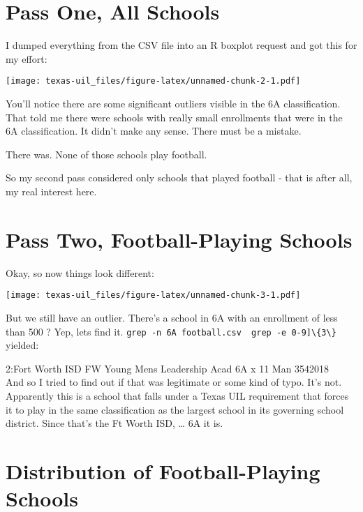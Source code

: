 \documentclass[]{book}
\begin{document}
\section{Pass One, All Schools}\label{pass-one-all-schools}

I dumped everything from the CSV file into an R boxplot request and got
this for my effort:

\texttt{[image: texas-uil\_files/figure-latex/unnamed-chunk-2-1.pdf]}

You'll notice there are some significant outliers visible in the 6A
classification. That told me there were schools with really small
enrollments that were in the 6A classification. It didn't make any
sense. There must be a mistake.

There was. None of those schools play football.

So my second pass considered only schools that played football - that is
after all, my real interest here.

\section{Pass Two, Football-Playing
Schools}\label{pass-two-football-playing-schools}

Okay, so now things look different:

\texttt{[image: texas-uil\_files/figure-latex/unnamed-chunk-3-1.pdf]}

But we still have an outlier. There's a school in 6A with an enrollment
of less than 500 ? Yep, lets find it.
\texttt{grep\ -n\ 6A\ football.csv\ \textbar{}\ grep\ -e\ \textquotesingle{}\textbar{}{[}0-9{]}\textbackslash{}\{3\textbackslash{}\}\textbar{}\textquotesingle{}}
yielded:

2:Fort Worth ISD \textbar{} FW Young Mens Leadership Acad \textbar{} 6A
\textbar{} x \textbar{} 11 Man \textbar{}354\textbar{}2018\\

And so I tried to find out if that was legitimate or some kind of typo.
It's not. Apparently this is a school that falls under a Texas UIL
requirement that forces it to play in the same classification as the
largest school in its governing school district. Since that's the Ft
Worth ISD, \ldots{} 6A it is.

\section{Distribution of Football-Playing
Schools}\label{distribution-of-football-playing-schools}
\end{document}
